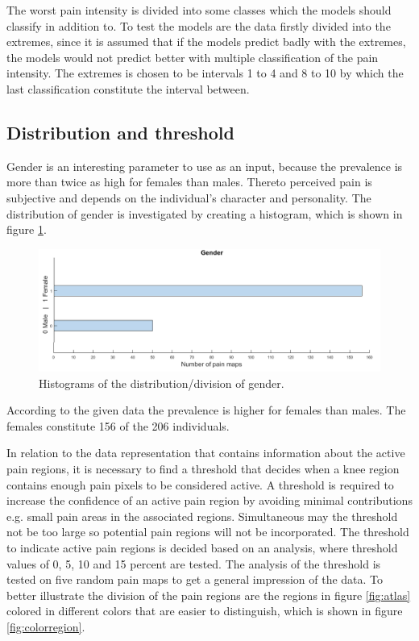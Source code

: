 \noindent
The worst pain intensity is divided into some classes which the models should classify in addition to. To test the models are the data firstly divided into the extremes, since it is assumed that if the models predict badly with the extremes, the models would not predict better with multiple classification of the pain intensity. The extremes is chosen to be intervals 1 to 4 and 8 to 10 by which the last classification constitute the interval between. 


\subsection{Distribution and threshold}
Gender is an interesting parameter to use as an input, because the prevalence is more than twice as high for females than males. Thereto perceived pain is subjective and depends on the individual's character and personality. The distribution of gender is investigated by creating a histogram, which is shown in figure \ref{fig:histogender}. 

\begin{figure} [H]
\centering
\includegraphics[width=1\textwidth]{figures/histoGender}
\caption{Histograms of the distribution/division of gender.}
\label{fig:histogender}
\end{figure}

\noindent
According to the given data the prevalence is higher for females than males. The females constitute 156 of the 206 individuals.

\noindent 
In relation to the data representation that contains information about the active pain regions, it is necessary to find a threshold that decides when a knee region contains enough pain pixels to be considered active. A threshold is required to increase the confidence of an active pain region by avoiding minimal contributions e.g. small pain areas in the associated regions. Simultaneous may the threshold not be too large so potential pain regions will not be incorporated. The threshold to indicate active pain regions is decided based on an analysis, where threshold values of 0, 5, 10 and 15 percent are tested. The analysis of the threshold is tested on five random pain maps to get a general impression of the data. To better illustrate the division of the pain regions are the regions in figure \ref{fig:atlas} colored in different colors that are easier to distinguish, which is shown in figure \ref{fig:colorregion}.

